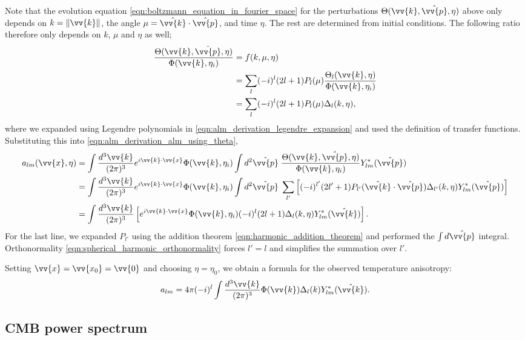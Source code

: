 \documentclass[a4paper,12pt,times,custombib,print,index]{Classes/PhDThesisPSnPDF} %
\begin{document}
Note that the evolution equation \eqref{eqn:boltzmann_equation_in_fourier_space} for the perturbations $\Theta(\vv{k},\hat{\vv{p}},\eta)$ above only depends on $k=\|\vv{k}\|$, the angle $\mu = \hat{\vv{k}} \cdot \hat{\vv{p}}$, and time $\eta$. The rest are determined from initial conditions. The following ratio therefore only depends on $k$, $\mu$ and $\eta$ as well;
\begin{align}
	\frac{\Theta(\vv{k},\hat{\vv{p}},\eta)}{\Phi(\vv{k},\eta_i)} &= f(k, \mu, \eta) \\
	&= \sum_l (-i)^l (2l+1) P_l(\mu) \frac{\Theta_l(\vv{k},\eta)}{\Phi(\vv{k},\eta_i)} \label{eqn:alm_derivation_legendre_expansion}\\ 
	&= \sum_l (-i)^l (2l+1) P_l(\mu) \Delta_l(k,\eta),
\end{align}
where we expanded using Legendre polynomials in \eqref{eqn:alm_derivation_legendre_expansion} and used the definition of transfer functions. Substituting this into \eqref{eqn:alm_derivation_alm_using_theta},
\begin{align}
	a_{lm}(\vv{x},\eta) &= \int \frac{d^3\vv{k}}{(2\pi)^3} e^{i\vv{k}\cdot\vv{x}} \Phi(\vv{k}, \eta_i) \int d^2\hat{\vv{p}} \; \frac{\Theta(\vv{k},\hat{\vv{p}},\eta)}{\Phi(\vv{k}, \eta_i)} Y^*_{lm}(\hat{\vv{p}}) \\
	&= \int \frac{d^3\vv{k}}{(2\pi)^3} e^{i\vv{k}\cdot\vv{x}} \Phi(\vv{k}, \eta_i) \int d^2\hat{\vv{p}} \; \sum_{l'} \left[ (-i)^{l'} (2l'+1) P_{l'}(\hat{\vv{k}}\cdot\hat{\vv{p}}) \Delta_{l'}(k,\eta) Y^*_{lm}(\hat{\vv{p}}) \right] \\
	&= \int \frac{d^3\vv{k}}{(2\pi)^3} \left[ e^{i\vv{k}\cdot\vv{x}} \Phi(\vv{k}, \eta_i) (-i)^{l} (2l+1) \Delta_{l}(k,\eta) Y^*_{lm}(\hat{\vv{k}}) \right].
\end{align}
For the last line, we expanded $P_{l'}$ using the addition theorem \eqref{eqn:harmonic_addition_theorem} and performed the $\int d\hat{\vv{p}}$ integral. Orthonormality \eqref{eqn:spherical_harmonic_orthonormality} forces $l'=l$ and simplifies the summation over $l'$.

Setting $\vv{x}=\vv{x_0} = \vv{0}$ and choosing $\eta=\eta_0$, we obtain a formula for the observed temperature anisotropy:
\begin{align}
	a_{lm} = 4\pi (-i)^l \int \frac{d^3\vv{k}}{(2\pi)^3} \Phi(\vv{k}) \Delta_{l}(k) Y^*_{lm}(\hat{\vv{k}}). \label{eqn:alm_from_phi}
\end{align}

\subsection{CMB power spectrum}
\end{document}

